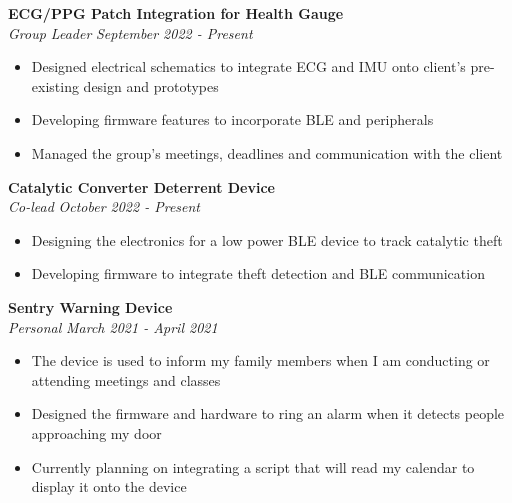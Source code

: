 \documentclass[a4paper,20pt]{article}
\begin{document}
    \vspace{-1pt}
        \textbf{ECG/PPG Patch Integration for Health Gauge} \\
        \textit{Group Leader} \hspace{11.6cm}
        \textit{September 2022 - Present}
        \vspace{-6pt}
    \begin{itemize}
        \item Designed electrical schematics to integrate ECG and IMU onto client's pre-existing design and prototypes \vspace{-5pt}
        \item Developing firmware features to incorporate BLE and peripherals\vspace{-5pt}
        \item Managed the group's meetings, deadlines and communication with the client
    \end{itemize}

    \vspace{-1pt}
        \textbf{Catalytic Converter Deterrent Device} \\
        \textit{Co-lead} \hspace{12.5cm}
        \textit{October 2022 - Present}
        \vspace{-6pt}
    \begin{itemize}
        \item Designing the electronics for a low power BLE device to track catalytic theft \vspace{-5pt}
        \item Developing firmware to integrate theft detection and BLE communication 
    \end{itemize}

    \vspace{-1pt}
        \textbf{Sentry Warning Device} \\
        \textit{Personal} \hspace{12.3cm}
        \textit{March 2021 - April 2021}
        \vspace{-6pt}
    \begin{itemize}
        \item The device is used to inform my family members when I am conducting or attending meetings and classes \vspace{-5pt}
        \item Designed the firmware and hardware to ring an alarm when it detects people approaching my door \vspace{-5pt}
        \item Currently planning on integrating a script that will read my calendar to display it onto the device
    \end{itemize}
\end{document}
